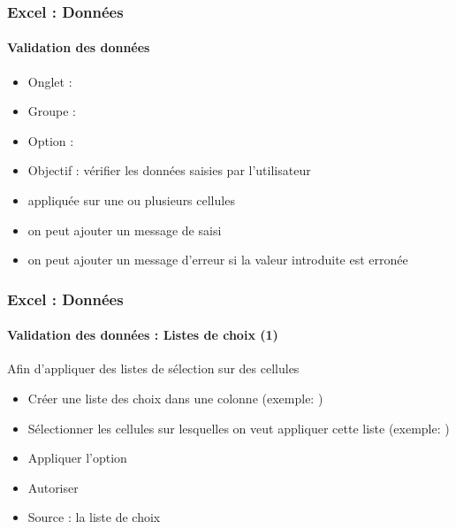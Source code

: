 \documentclass[xcolor=table, usenames,dvipsnames]{beamer}
\begin{document}
\begin{frame}
\frametitle{Excel : Données}
\framesubtitle{Validation des données}

\begin{minipage}{0.5\textwidth}
	\begin{itemize}
		\item Onglet : 
		\item Groupe : 
		\item Option : 
		\item Objectif : vérifier les données saisies par l'utilisateur
		\item appliquée sur une ou plusieurs cellules
		\item on peut ajouter un message de saisi
		\item on peut ajouter un message d'erreur si la valeur introduite est erronée
	\end{itemize}
\end{minipage}
%
\begin{minipage}{0.49\textwidth}
	
\end{minipage}

\end{frame}

\begin{frame}
\frametitle{Excel : Données}
\framesubtitle{Validation des données : Listes de choix (1)}

\begin{minipage}{0.60\textwidth}
	Afin d'appliquer des listes de sélection sur des cellules
	\begin{itemize}
		\item Créer une liste des choix dans une colonne (exemple: )
		\item Sélectionner les cellules sur lesquelles on veut appliquer cette liste (exemple: )
		\item Appliquer l'option 
		\item Autoriser 
		\item Source : la liste de choix 
	\end{itemize}
\end{minipage}
%
\begin{minipage}{0.39\textwidth}
	
\end{minipage}

\end{frame}
\end{document}
